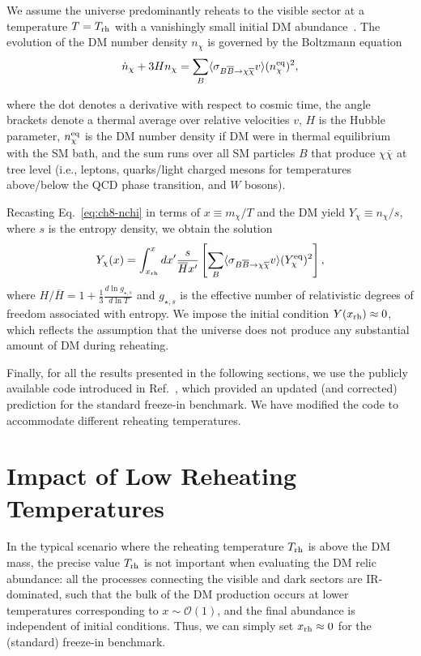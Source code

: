 We assume the universe predominantly reheats to the visible sector at a temperature $T=T_{\rm{rh}}$ with a vanishingly small initial DM abundance~\cite{Hall:2009bx}. The evolution of the DM number density $n_\chi$ is governed by the Boltzmann equation
\begin{equation}
    \dot{n}_\chi+3H n_\chi=\sum_{B} \langle \sigma_{B\overline{B} \rightarrow \chi\overline{\chi}} v \rangle (n^{\rm eq}_\chi)^2, \label{eq:ch8-nchi}
\end{equation}

where the dot denotes a derivative with respect to cosmic time, the angle brackets denote a thermal average over relative velocities $v$, $H$ is the Hubble parameter, $n^{\rm eq}_\chi$ is the DM number density if DM were in thermal equilibrium with the SM bath, and the sum runs over all SM particles $B$ that produce $\chi \overline{\chi}$ at tree level (i.e., leptons, quarks/light charged mesons for temperatures above/below the QCD phase transition, and $W$ bosons).

Recasting Eq.~\eqref{eq:ch8-nchi} in terms of $x\equiv m_\chi/T$ and the DM yield $Y_\chi\equiv n_\chi/s$, where $s$ is the entropy density, we obtain the solution
\begin{equation}
     Y_\chi(x)=\int_{x_{\rm rh}}^x dx^\prime \frac{s}{\overline{H}x^\prime}\left[\sum_{B}\langle \sigma_{B\overline{B} \rightarrow \chi\overline{\chi}} v \rangle  (Y^{\rm eq}_\chi)^2\right], \label{eq:ch8-Ychi}
\end{equation}
where $H/\overline{H}= 1+ \frac{1}{3}\frac{d\ln g_{\star,s}}{d\ln T}$ and $g_{\star,s}$ is the effective number of relativistic degrees of freedom associated with entropy.
We impose the initial condition $Y(x_{\rm rh})\approx 0$, which reflects the assumption that the universe does not produce any substantial amount of DM during reheating.

Finally, for all the results presented in the following sections, we use the publicly available code introduced in Ref.~\cite{Bhattiprolu:2023akk}, which provided an updated (and corrected) prediction for the standard freeze-in benchmark. We have modified the code to accommodate different reheating temperatures.

\section{Impact of Low Reheating Temperatures}
\label{sec:ch8-lowTrh}

In the typical scenario where the reheating temperature $T_{\rm{rh}}$ is above the DM mass, the precise value $T_{\rm{rh}}$ is not important when evaluating the DM relic abundance: all the processes connecting the visible and dark sectors are IR-dominated, such that the bulk of the DM production occurs at lower temperatures corresponding to $x\sim \mathcal{O}(1)$, and the final abundance is independent of initial conditions. Thus, we can simply set $x_{\rm{rh}}\approx 0$ for the (standard) freeze-in benchmark.

